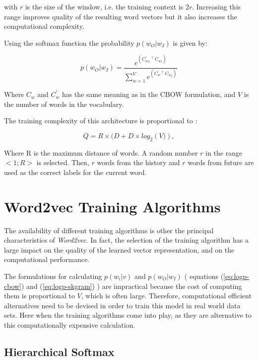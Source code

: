 with $r$ is the size of the window, i.e. the training context is $2r$.
Increasing this range improves quality of the resulting word vectors but it
also increases the computational complexity.

Using the softmax function the probability  $p(w_O|w_I)$ is given by:

\begin{equation}
  \label{eq:logp-skgram}
  p(w_O|w_I) = \frac{e^{\left(C^{'}_{w_O}\,^\top\,C_{w_I} \right)}
  }{\sum^{V}_{w=1} e^{\left( C^{'}_w \,^\top\, C_{w_I} \right) } }  
\end{equation}


Where $C_w$ and $C^{'}_w$  has the same meaning as in the \ac{CBOW}
formulation,  and $V$ is the number of words in the vocabulary.

The training complexity of this architecture is proportional to
\cite{DBLP:journals/corr/abs-1301-3781}:

\begin{equation}
  Q = R \times (D + D \times log_2 \left(V)\right),  
\end{equation}

Where R is the maximum distance of words. A random number $r$ in the range $<
1; R >$ is selected. Then, $r$ words from the history and $r$ words from future are used as the correct labels for the current word.
 

\section{Word2vec Training Algorithms}
\label{sec:word2v-tran-algorithms}
The availability of different training algorithms is other  the principal
characteristics of  \textit{Word2vec}. In fact, the selection of the training algorithm has a large  impact on
 the quality of the learned vector representation,  and on the
computational performance.

The formulations for calculating $p(w_i|v)$ and  $p(w_O|w_I)$  ( equations
(\ref{eq:logp-cbow})  and  (\ref{eq:logp-skgram}) ) are impractical because
the cost of computing them is proportional to $V$, which is often large.
Therefore, computational efficient alternatives need to be devised in order to
train this model in real world data sets. Here when the training algorithms
come into play, as they are alternative to this computationally expensive
calculation. 

\subsection{Hierarchical Softmax}
\label{sec:sub-hs}


